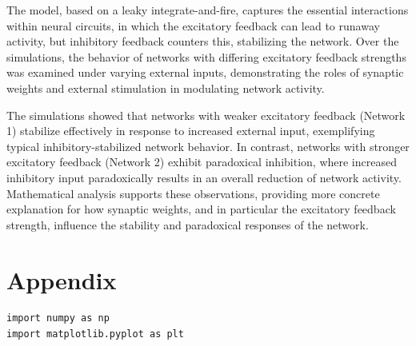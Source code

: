 \documentclass[10pt,twocolumn]{article}
\begin{document}
The model, based on a leaky integrate-and-fire, captures the essential 
interactions within neural circuits, in which the excitatory feedback can lead to 
runaway activity, but inhibitory feedback counters this, stabilizing the network. 
Over the simulations, the behavior of networks with differing excitatory feedback strengths was 
examined under varying external inputs, demonstrating the roles of synaptic weights and external 
stimulation in modulating network activity.

The simulations showed that networks with weaker excitatory feedback (Network 1) stabilize 
effectively in response to increased external input, exemplifying typical inhibitory-stabilized 
network behavior. In contrast, networks with stronger excitatory feedback (Network 2) 
exhibit paradoxical inhibition, where increased inhibitory input paradoxically results 
in an overall reduction of network activity. Mathematical analysis supports these observations, 
providing more concrete explanation for how synaptic weights, and in particular the 
excitatory feedback strength, influence the stability 
and paradoxical responses of the network. 


\clearpage
\printbibliography

\clearpage
\appendix
\section{Appendix}

\begin{lstlisting}[style=python,caption=Python code for simulations]
import numpy as np
import matplotlib.pyplot as plt
\end{lstlisting}
\end{document}
